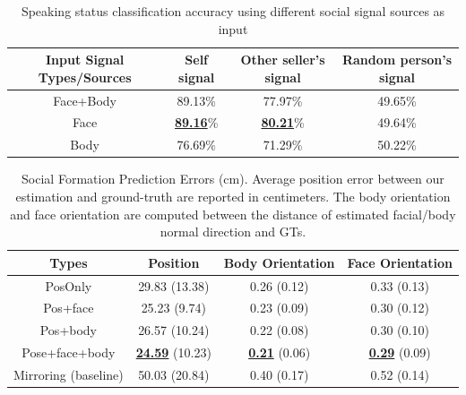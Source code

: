 \begin{table}[t]
	\centering
	\begin{tabular}{c| c| c| c}
		\hline
		Input Signal Types/Sources & Self signal & Other seller's signal & Random person's signal\\
		\hline
		Face+Body & 89.13\% & 77.97\% & 49.65\%\\       %
				\hline
		Face & \underline {\textbf{89.16}}\% & \underline {\textbf{80.21}}\% & 49.64\%\\       %
				\hline
		Body & 76.69\% & 71.29\% & 50.22\%\\       %
		\hline
	\end{tabular}
	\caption{Speaking status classification accuracy using different social signal sources as input\label{table:speaking_class}}
\end{table}

\begin{table}[t]
	\centering
	\begin{tabular}{c| c| c| c}
		\hline
		Types & Position & Body Orientation & Face Orientation\\
		\hline
		PosOnly & 29.83 (13.38) & 0.26 (0.12) & 0.33 (0.13) \\
		\hline
		Pos+face & 25.23 (9.74) & 0.23 (0.09) & 0.30 (0.12) \\
		\hline
		Pos+body & 26.57 (10.24) & 0.22 (0.08) & 0.30 (0.10) \\
		\hline
		Pose+face+body & \underline {\textbf{24.59}} (10.23) &  \underline {\textbf{0.21}} (0.06) &  \underline {\textbf{0.29}} (0.09) \\
		\hline
		Mirroring (baseline) &  50.03 (20.84) & 0.40 (0.17) & 0.52 (0.14) \\
				\hline
	\end{tabular}
	\caption{Social Formation Prediction Errors (cm). Average position error between our estimation and ground-truth are reported in centimeters. The body orientation and face orientation are computed between the distance of estimated facial/body normal direction and GTs.\label{table:predForm_errors}}
\end{table}

